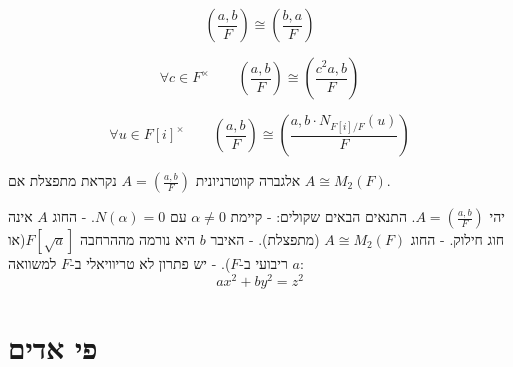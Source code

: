 \documentclass{tstextbook}
\begin{document}
\begin{proposition}
$$\left( \frac{a,b}{F} \right) \cong \left( \frac{b,a}{F} \right)$$

\end{proposition}
\begin{proposition}
$$\forall c \in F^{\times}\qquad \left( \frac{a,b}{F} \right) \cong \left( \frac{c^2 a, b}{F} \right)$$

\end{proposition}
\begin{corollary}
$$\forall u \in F[i]^{\times}\qquad\left( \frac{a,b}{F} \right) \cong \left( \frac{a, b \cdot N_{F[i]/F}(u)}{F} \right)$$

\end{corollary}
\begin{reminder}
אלגברה קווטרניונית  \(A = \left( \frac{a,b}{F} \right)\) נקראת מתפצלת אם \(A \cong M_2(F)\).

\end{reminder}
\begin{proposition}
יהי \(A = \left( \frac{a,b}{F} \right)\). התנאים הבאים שקולים:
- קיימת \(\alpha \neq 0\) עם \(N(\alpha) = 0\).
- החוג \(A\) אינה חוג חילוק.
- החוג \(A \cong M_2(F)\) (מתפצלת).
- האיבר \(b\) היא נורמה מההרחבה \(F[\sqrt{a}]\)(או \(a\) ריבועי ב-\(F\)).
- יש פתרון לא טריוויאלי ב-\(F\) למשוואה:
$$ax^{2}+by^{2}=z^{2}$$

\end{proposition}
\section{פי אדים}
\end{document}
